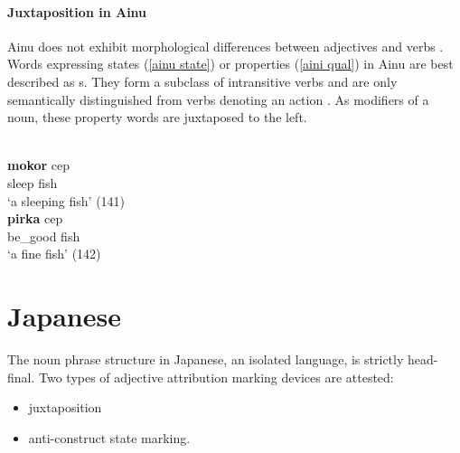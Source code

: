 \paragraph*{Juxtaposition in Ainu}
\label{ainu synchr}
Ainu does not exhibit morphological differences between adjectives and verbs \citep[27]{refsing1986}. Words expressing states (\ref{ainu state}) or properties (\ref{aini qual}) in Ainu are best described as s. They form a subclass of intransitive verbs and are only semantically distinguished from verbs denoting an action \citep[141–142]{refsing1986}. As modifiers of a noun, these property words are juxtaposed to the left.
\begin{exe}
\begin{xlist}
\\
\label{ainu state}
\gll	\textbf{mokor} cep\\
	sleep fish\\
\glt	‘a sleeping fish’ (141)
\\
\label{aini qual}
\gll	\textbf{pirka} cep\\
	be\_good fish\\
\glt	‘a fine fish’ (142)
\end{xlist}
\end{exe}

\section{Japanese}
The noun phrase structure in Japanese, an isolated language, is strictly head-final. Two types of adjective attribution marking devices are attested:
\begin{itemize}
\item juxtaposition
\item anti\hyp{}construct state marking.
\end{itemize}
